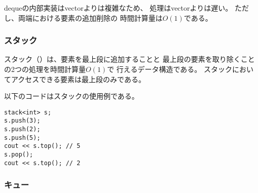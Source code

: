 dequeの内部実装はvectorよりは複雑なため、
処理はvectorよりは遅い。
ただし、両端における要素の追加削除の
時間計算量は$O(1)$である。

\begin{comment}
\subsubsection{Stack}

\index{stack}

A \key{stack}
is a data structure that provides two
$O(1)$ time operations:
adding an element to the top,
and removing an element from the top.
It is only possible to access the top
element of a stack.

The following code shows how a stack can be used:
\end{comment}

\subsubsection{スタック}


スタック（）は、要素を最上段に追加することと
最上段の要素を取り除くことの2つの処理を時間計算量$O(1)$で
行えるデータ構造である。
スタックにおいてアクセスできる要素は最上段のみである。

以下のコードはスタックの使用例である。

\begin{lstlisting}
stack<int> s;
s.push(3);
s.push(2);
s.push(5);
cout << s.top(); // 5
s.pop();
cout << s.top(); // 2
\end{lstlisting}

\begin{comment}
\subsubsection{Queue}

\index{queue}

A \key{queue} also
provides two $O(1)$ time operations:
adding an element to the end of the queue,
and removing the first element in the queue.
It is only possible to access the first
and last element of a queue.

The following code shows how a queue can be used:
\end{comment}

\subsubsection{キュー}

